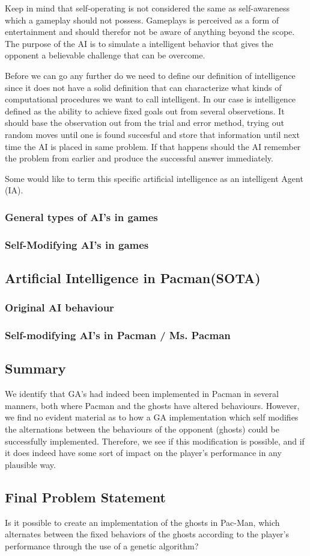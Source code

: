 Keep in mind that self-operating is not considered the same as self-awareness which a gameplay should not possess. Gameplays is perceived as a form of entertainment and should therefor not be aware of anything beyond the scope. The purpose of the AI is to simulate a intelligent behavior that gives the opponent a believable challenge that can be overcome. 

Before we can go any further do we need to define our definition of intelligence since it does not have a solid definition that can characterize what kinds of computational procedures we want to call intelligent. 
In our case is intelligence defined as the ability to achieve fixed goals out from several observetions.
It should base the observation out from the trial and error method, trying out random moves until one is found succesful and store that information until next time the AI is placed in same problem. If that happens should the AI remember the problem from earlier and produce the successful answer immediately. 

Some would like to term this specific artificial intelligence as an intelligent Agent (IA). 


\subsubsection{General types of AI's in games}






\subsubsection{Self-Modifying AI's in games}


\subsection{Artificial Intelligence in Pacman(SOTA)}
\subsubsection{Original AI behaviour}
\subsubsection{Self-modifying AI's in Pacman / Ms. Pacman}

\subsection{Summary}
We identify that GA’s had indeed been implemented in Pacman in several manners, both where Pacman and the ghosts have altered behaviours. However, we find no evident material as to how a GA implementation which self modifies the alternations between the behaviours of the opponent (ghosts) could be successfully implemented. Therefore, we see if this modification is possible, and if it does indeed have some sort of impact on the player’s performance in any plausible way.


\subsection{Final Problem Statement} \label{sec:finalproblemstatement}
Is it possible to create an implementation of the ghosts in Pac-Man, which alternates between the fixed behaviors of the ghosts according to the player's performance through the use of a genetic algorithm?
